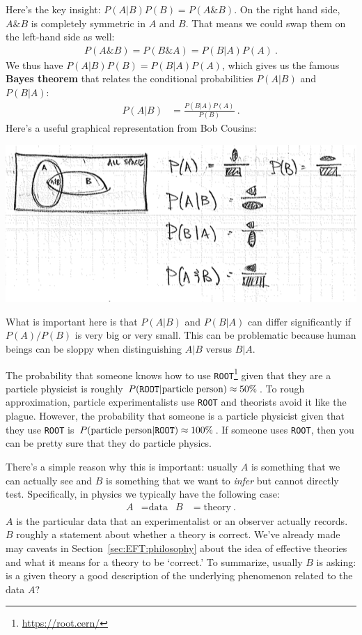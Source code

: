 Here's the key insight: $P(A|B)P(B) = P(A\& B)$. On the right hand side, $A\&B$ is completely symmetric in $A$ and $B$. That means we could swap them on the left-hand side as well: 
\begin{align}
	P(A\&B) = P(B\& A) = P(B|A)P(A) \ . 
\end{align}
We thus have $P(A|B)P(B)=P(B|A)P(A)$, which gives us the famous \textbf{Bayes theorem} that relates the conditional probabilities $P(A|B)$ and $P(B|A)$:
\begin{align}
	P(A|B) &= \frac{P(B|A) P(A)}{P(B)} \ .
\end{align}
Here's a useful graphical representation from Bob Cousins:
\begin{center}
\includegraphics[width=.8\textwidth]{figures/ConditionalProb.png}
\end{center}
What is important here is that $P(A|B)$ and $P(B|A)$ can differ significantly if $P(A)/P(B)$ is very big or very small. This can be problematic because human beings can be sloppy when distinguishing $A|B$ versus $B|A$. 
\begin{example}
The probability that someone knows how to use \texttt{ROOT}\footnote{\url{https://root.cern/}} given that they are a particle physicist is roughly $P(\text{\texttt{ROOT}}|\text{particle person}) \approx 50\%$. To rough approximation, particle experimentalists use \texttt{ROOT} and theorists avoid it like the plague. However, the probability that someone is a particle physicist given that they use \texttt{ROOT} is $P(\text{particle person}|\text{\texttt{ROOT}}) \approx 100\%$. If someone uses \texttt{ROOT}, then you can be pretty sure that they do particle physics.
\end{example}

There's a simple reason why this is important: usually $A$ is something that we can actually see and $B$ is something that we want to \emph{infer} but cannot directly test. Specifically, in physics we typically have the following case:
\begin{align}
	A &= \text{data} 
	&
	B &= \text{theory} \ .
\end{align}
$A$ is the particular data that an experimentalist or an observer actually records. $B$ roughly a statement about whether a theory is correct. 
% 
We've already made may caveats in Section~\ref{sec:EFT:philosophy} about the idea of effective theories and what it means for a theory to be `correct.' To summarize, usually $B$ is asking: is a given theory a good description of the underlying phenomenon related to the data $A$? 

